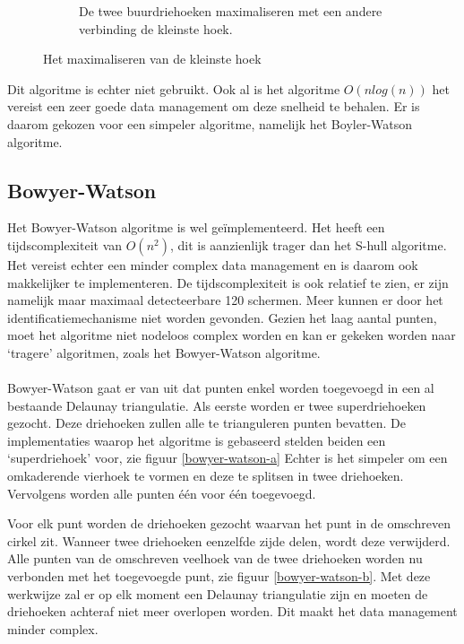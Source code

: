 \begin{figure}
\begin{subfigure}{0.4\textwidth}
		\caption{De twee buurdriehoeken maximaliseren met een andere verbinding de kleinste hoek.}
	\end{subfigure}
	\caption{Het maximaliseren van de kleinste hoek \cite{delaunaywiki}}
	\label{driehoekswitch}
\end{figure}

Dit algoritme is echter niet gebruikt. Ook al is het algoritme $O(nlog(n))$ het vereist een zeer goede data management om deze snelheid te behalen.  \cite{Lund2014} Er is daarom gekozen voor een simpeler algoritme, namelijk het Boyler-Watson algoritme.

\subsection{Bowyer-Watson}
Het Bowyer-Watson algoritme is wel geïmplementeerd. Het heeft een tijdscomplexiteit van $O(n^2)$, dit is aanzienlijk trager dan het S-hull algoritme. \cite{Bowyer-WatsonWiki} Het vereist echter een minder complex data management en is daarom ook makkelijker te implementeren. De tijdscomplexiteit is ook relatief te zien, er zijn namelijk maar maximaal detecteerbare 120 schermen. Meer kunnen er door het identificatiemechanisme niet worden gevonden. Gezien het laag aantal punten, moet het algoritme niet nodeloos complex worden en kan er gekeken worden naar `tragere' algoritmen, zoals het Bowyer-Watson algoritme.

\paragraph{}
Bowyer-Watson gaat er van uit dat punten enkel worden toegevoegd in een al bestaande Delaunay triangulatie. Als eerste worden er twee superdriehoeken gezocht. Deze driehoeken zullen alle te trianguleren punten bevatten. De implementaties waarop het algoritme is gebaseerd \cite{Bowyer-WatsonWiki} \cite{bowyer-watsonImplementation} stelden beiden een `superdriehoek' voor, zie figuur \ref{bowyer-watson-a} Echter is het simpeler om een omkaderende vierhoek te vormen en deze te splitsen in twee driehoeken. Vervolgens worden alle punten één voor één toegevoegd.

Voor elk punt worden de driehoeken gezocht waarvan het punt in de omschreven cirkel zit. Wanneer twee driehoeken eenzelfde zijde delen, wordt deze verwijderd. Alle punten van de omschreven veelhoek van de twee driehoeken worden nu verbonden met het toegevoegde punt, zie figuur \ref{bowyer-watson-b}. Met deze werkwijze zal er op elk moment een Delaunay triangulatie zijn en moeten de driehoeken achteraf niet meer overlopen worden. Dit maakt het data management minder complex.

